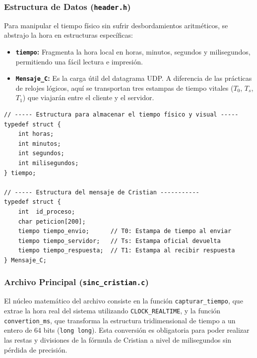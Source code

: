 \subsubsection{Estructura de Datos (\texttt{header.h})}

Para manipular el tiempo físico sin sufrir desbordamientos aritméticos, se abstrajo la hora en estructuras específicas:
\begin{itemize}
    \item \textbf{\texttt{tiempo}:} Fragmenta la hora local en horas, minutos, segundos y milisegundos, permitiendo una fácil lectura e impresión.
    \item \textbf{\texttt{Mensaje\_C}:} Es la carga útil del datagrama UDP. A diferencia de las prácticas de relojes lógicos, aquí se transportan tres estampas de tiempo vitales ($T_0$, $T_s$, $T_1$) que viajarán entre el cliente y el servidor.
\end{itemize}

\begin{lstlisting}[style=estiloC]
// ----- Estructura para almacenar el tiempo físico y visual -----
typedef struct {
    int horas;
    int minutos;
    int segundos;
    int milisegundos;
} tiempo;

// ----- Estructura del mensaje de Cristian -----------
typedef struct {
    int  id_proceso;            
    char peticion[200];         
    tiempo tiempo_envio;      // T0: Estampa de tiempo al enviar
    tiempo tiempo_servidor;   // Ts: Estampa oficial devuelta
    tiempo tiempo_respuesta;  // T1: Estampa al recibir respuesta
} Mensaje_C;
\end{lstlisting}

\subsubsection{Archivo Principal (\texttt{sinc\_cristian.c})}

El núcleo matemático del archivo consiste en la función \texttt{capturar\_tiempo}, que extrae la hora real del sistema utilizando \texttt{CLOCK\_REALTIME}, y la función \texttt{convertion\_ms}, que transforma la estructura tridimensional de tiempo a un entero de 64 bits (\texttt{long long}). Esta conversión es obligatoria para poder realizar las restas y divisiones de la fórmula de Cristian a nivel de milisegundos sin pérdida de precisión.

